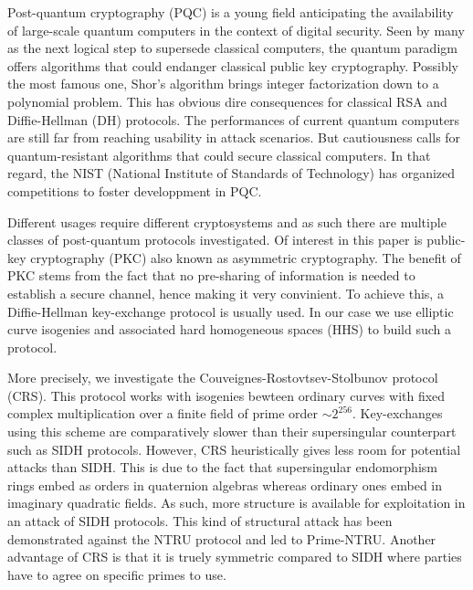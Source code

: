 \documentclass[../main.tex]{subfiles}
\begin{document}
Post-quantum cryptography (PQC) is a young field anticipating the availability of large-scale quantum computers in the context of digital security.
Seen by many as the next logical step to supersede classical computers, the quantum paradigm offers algorithms that could endanger classical public key cryptography.
Possibly the most famous one, Shor's algorithm \cite{Shor} brings integer factorization down to a polynomial problem.
This has obvious dire consequences for classical RSA and Diffie-Hellman (DH) protocols.
The performances of current quantum computers are still far from reaching usability in attack scenarios.
But cautiousness calls for quantum-resistant algorithms that could secure classical computers.
In that regard, the NIST (National Institute of Standards of Technology) has organized competitions to foster developpment in PQC.

Different usages require different cryptosystems and as such there are multiple classes of post-quantum protocols investigated.
Of interest in this paper is public-key cryptography (PKC) also known as asymmetric cryptography.
The benefit of PKC stems from the fact that no pre-sharing of information is needed to establish a secure channel, hence making it very convinient.
To achieve this, a Diffie-Hellman key-exchange protocol is usually used.
In our case we use elliptic curve isogenies and associated hard homogeneous spaces (HHS) to build such a protocol.

More precisely, we investigate the Couveignes-Rostovtsev-Stolbunov protocol (CRS).
This protocol works with isogenies bewteen ordinary curves with fixed complex multiplication over a finite field of prime order $\sim 2^{256}$.
Key-exchanges using this scheme are comparatively slower than their supersingular counterpart such as SIDH protocols.
However, CRS heuristically gives less room for potential attacks than SIDH.
This is due to the fact that supersingular endomorphism rings embed as orders in quaternion algebras whereas ordinary ones embed in imaginary quadratic fields.
As such, more structure is available for exploitation in an attack of SIDH protocols.
This kind of structural attack has been demonstrated against the NTRU protocol and led to Prime-NTRU.
Another advantage of CRS is that it is truely symmetric compared to SIDH where parties have to agree on specific primes to use.
\end{document}
